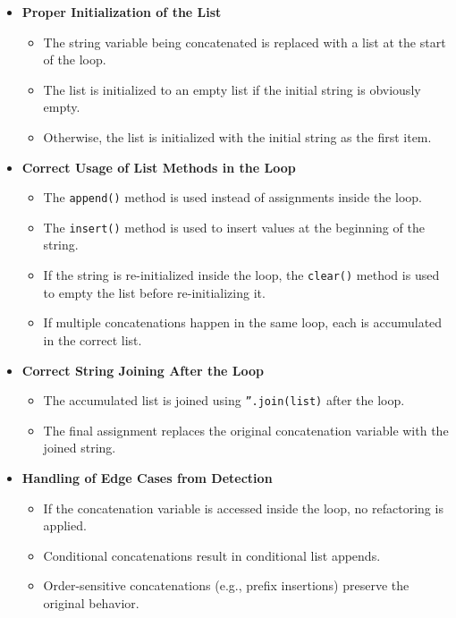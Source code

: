 \documentclass[12pt, titlepage]{article}
\begin{document}
\begin{itemize}
    \item \textbf{Proper Initialization of the List}
    \begin{itemize}
        \item The string variable being concatenated is replaced with a list at the start of the loop.
        \item The list is initialized to an empty list if the initial string is obviously empty.
        \item Otherwise, the list is initialized with the initial string as the first item.
    \end{itemize}

    \item \textbf{Correct Usage of List Methods in the Loop}
    \begin{itemize}
        \item The \texttt{append()} method is used instead of assignments inside the loop.
        \item The \texttt{insert()} method is used to insert values at the beginning of the string.
        \item If the string is re-initialized inside the loop, the \texttt{clear()} method is used to empty the list before re-initializing it.
        \item If multiple concatenations happen in the same loop, each is accumulated in the correct list.
    \end{itemize}

    \item \textbf{Correct String Joining After the Loop}
    \begin{itemize}
        \item The accumulated list is joined using \texttt{''.join(list)} after the loop.
        \item The final assignment replaces the original concatenation variable with the joined string.
    \end{itemize}

    \item \textbf{Handling of Edge Cases from Detection}
    \begin{itemize}
        \item If the concatenation variable is accessed inside the loop, no refactoring is applied.
        \item Conditional concatenations result in conditional list appends.
        \item Order-sensitive concatenations (e.g., prefix insertions) preserve the original behavior.
    \end{itemize}


\end{itemize}
\end{document}

